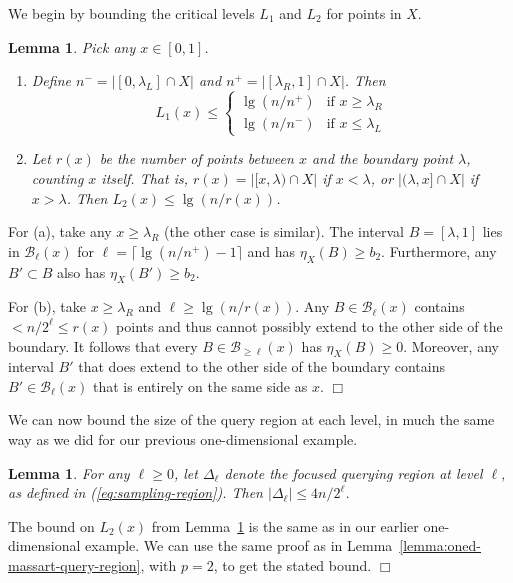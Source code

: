 \documentclass{article}
\def\B{{\mathcal B}}
\newtheorem{lemma}[thm]{Lemma}
\newenvironment{proof}{\noindent {\sc Proof:}}{$\Box$ \medskip}
\begin{document}
We begin by bounding the critical levels $L_1$ and $L_2$ for points in $X$.
\begin{lemma}
Pick any $x \in [0, 1]$.
\begin{enumerate}
\item[(a)] Define $n^- = |[0,\lambda_L] \cap X|$ and $n^+ = |[\lambda_R,1] \cap X|$. Then
$$
L_1(x)
\leq
\left\{
\begin{array}{ll}
\lg (n/n^+) & \mbox{if $x \geq \lambda_R$} \\
\lg (n/n^-) & \mbox{if $x \leq \lambda_L$}
\end{array}
\right.
$$
\item[(b)] Let $r(x)$ be the number of points between $x$ and the boundary point $\lambda$, counting $x$ itself. That is, $r(x) = |[x,\lambda) \cap X|$ if $x < \lambda$, or $|(\lambda, x] \cap X|$ if $x > \lambda$. Then $L_2(x) \leq \lg (n/r(x))$.
\end{enumerate}
\label{lemma:oned-monotonic-L}
\end{lemma}
\begin{proof}
For (a), take any $x \geq \lambda_R$ (the other case is similar). The interval $B = [\lambda,1]$ lies in $\B_\ell(x)$ for $\ell = \lceil \lg (n/n^+) - 1 \rceil$ and has $\eta_X(B) \geq b_2$. Furthermore, any $B' \subset B$ also has $\eta_X(B') \geq b_2$. 

For (b), take $x \geq \lambda_R$ and $\ell \geq \lg (n/r(x))$. Any $B \in \B_\ell(x)$ contains $< n/2^\ell \leq r(x)$ points and thus cannot possibly extend to the other side of the boundary. It follows that every $B \in \B_{\geq \ell}(x)$ has $\eta_X(B) \geq 0$. Moreover, any interval $B'$ that does extend to the other side of the boundary contains $B' \in \B_{\ell}(x)$ that is entirely on the same side as $x$.
\end{proof}

We can now bound the size of the query region at each level, in much the same way as we did for our previous one-dimensional example.
\begin{lemma}
For any $\ell \geq 0$, let $\Delta_\ell$ denote the focused querying region at level $\ell$, as defined in (\ref{eq:sampling-region}). Then $|\Delta_\ell| \leq 4n/2^\ell$.
\label{lemma:oned-monotonic-query-region}
\end{lemma}

\begin{proof}
The bound on $L_2(x)$ from Lemma~\ref{lemma:oned-monotonic-L} is the same as in our earlier one-dimensional example. We can use the same proof as in Lemma~\ref{lemma:oned-massart-query-region}, with $p=2$, to get the stated bound.
\end{proof}
\end{document}
